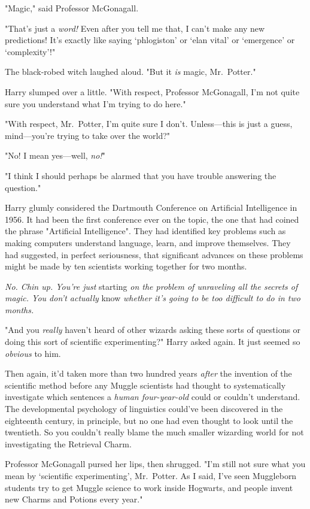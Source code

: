 "Magic," said Professor McGonagall.

"That's just a \emph{word!} Even after you tell me that, I can't make any new
predictions! It's exactly like saying `phlogiston' or `elan vital' or
`emergence' or `complexity'!"

The black-robed witch laughed aloud. "But it \emph{is} magic, Mr.~Potter."

Harry slumped over a little. "With respect, Professor McGonagall, I'm not quite
sure you understand what I'm trying to do here."

"With respect, Mr.~Potter, I'm quite sure I don't. Unless—this is just a
guess, mind—you're trying to take over the world?"

"No! I mean yes—well, \emph{no!}"

"I think I should perhaps be alarmed that you have trouble answering the
question."

Harry glumly considered the Dartmouth Conference on Artificial Intelligence in
1956. It had been the first conference ever on the topic, the one that had
coined the phrase "Artificial Intelligence". They had identified key problems
such as making computers understand language, learn, and improve themselves.
They had suggested, in perfect seriousness, that significant advances on these
problems might be made by ten scientists working together for two months.

\emph{No. Chin up. You're just} starting \emph{on the problem of unraveling
all the secrets of magic. You don't actually} know \emph{whether it's going to
be too difficult to do in two months.}

"And you \emph{really} haven't heard of other wizards asking these sorts of
questions or doing this sort of scientific experimenting?" Harry asked again.
It just seemed so \emph{obvious} to him.

Then again, it'd taken more than two hundred years \emph{after} the invention
of the scientific method before any Muggle scientists had thought to
systematically investigate which sentences a \emph{human four-year-old} could
or couldn't understand. The developmental psychology of linguistics could've
been discovered in the eighteenth century, in principle, but no one had even
thought to look until the twentieth. So you couldn't really blame the much
smaller wizarding world for not investigating the Retrieval Charm.

Professor McGonagall pursed her lips, then shrugged. "I'm still not sure what
you mean by `scientific experimenting', Mr.~Potter. As I said, I've seen
Muggleborn students try to get Muggle science to work inside Hogwarts, and
people invent new Charms and Potions every year."


